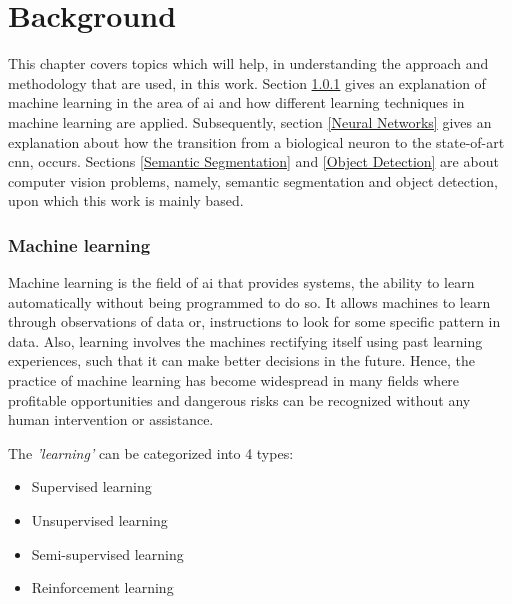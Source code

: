 \lhead{\thepage}

\chapter{Background}

This chapter covers topics which will help, in understanding the approach and methodology that are used, in this work. Section \ref{Machine Learning} gives an explanation of machine learning in the area of \ac{ai} and how different learning techniques in machine learning are applied. Subsequently, section \ref{Neural Networks} gives an explanation about how the transition from a biological neuron to the state-of-art \ac{cnn}, occurs. Sections \ref{Semantic Segmentation} and \ref{Object Detection} are about computer vision problems, namely, semantic segmentation and object detection, upon which this work is mainly based.


\subsection{Machine learning} \label{Machine Learning}

Machine learning is the field of \ac{ai} that provides systems, the ability to learn automatically without being programmed to do so. It allows machines to learn through observations of data or, instructions to look for some specific pattern in data. Also, learning involves the machines rectifying itself using past learning experiences, such that it can make better decisions in the future. Hence, the practice of machine learning has become widespread in many fields where profitable opportunities and dangerous risks can be recognized without any human intervention or assistance.

\par
 
The \textit{'learning'} can be categorized into 4 types: 


\begin{itemize}
    \item Supervised learning
    \item Unsupervised learning
    \item Semi-supervised learning
    \item Reinforcement learning
\end{itemize}

